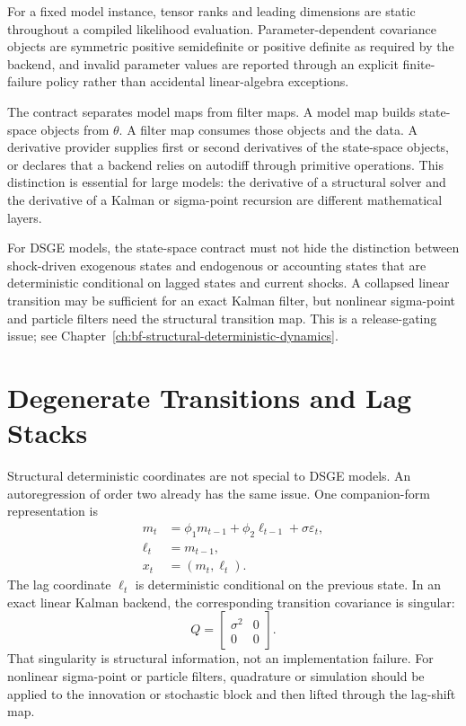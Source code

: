 \begin{assumption}
\label{asm:bf-shape-value-contract}
For a fixed model instance, tensor ranks and leading dimensions are static
throughout a compiled likelihood evaluation.  Parameter-dependent covariance
objects are symmetric positive semidefinite or positive definite as required by
the backend, and invalid parameter values are reported through an explicit
finite-failure policy rather than accidental linear-algebra exceptions.
\end{assumption}

The contract separates model maps from filter maps.  A model map builds
state-space objects from $\theta$.  A filter map consumes those objects and the
data.  A derivative provider supplies first or second derivatives of the
state-space objects, or declares that a backend relies on autodiff through
primitive operations.  This distinction is essential for large models: the
derivative of a structural solver and the derivative of a Kalman or sigma-point
recursion are different mathematical layers.

\begin{remark}
\label{rem:bf-structural-deterministic-contract}
For DSGE models, the state-space contract must not hide the distinction between
shock-driven exogenous states and endogenous or accounting states that are
deterministic conditional on lagged states and current shocks.  A collapsed
linear transition may be sufficient for an exact Kalman filter, but nonlinear
sigma-point and particle filters need the structural transition map.  This is a
release-gating issue; see
Chapter~\ref{ch:bf-structural-deterministic-dynamics}.
\end{remark}

\section{Degenerate Transitions and Lag Stacks}
\label{sec:bf-degenerate-transitions-lag-stacks}

Structural deterministic coordinates are not special to DSGE models.  An
autoregression of order two already has the same issue.  One companion-form
representation is
\begin{align}
  m_t &= \phi_1 m_{t-1} + \phi_2 \ell_{t-1} + \sigma\varepsilon_t,\\
  \ell_t &= m_{t-1},\\
  x_t &= (m_t,\ell_t).
\end{align}
The lag coordinate $\ell_t$ is deterministic conditional on the previous
state.  In an exact linear Kalman backend, the corresponding transition
covariance is singular:
\[
  Q =
  \begin{bmatrix}
    \sigma^2 & 0\\
    0 & 0
  \end{bmatrix}.
\]
That singularity is structural information, not an implementation failure.
For nonlinear sigma-point or particle filters, quadrature or simulation should
be applied to the innovation or stochastic block and then lifted through the
lag-shift map.

